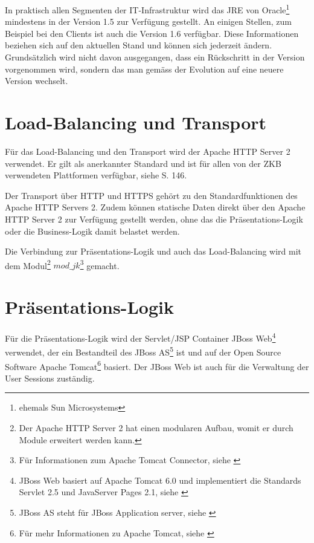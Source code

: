   In praktisch allen Segmenten der IT-Infrastruktur wird das \ac{JRE}
  von Oracle\footnote{ehemals Sun Microsystems} mindestens in der Version 1.5
  zur Verfügung gestellt. An einigen Stellen, zum Beispiel bei den Clients ist
  auch die Version 1.6 verfügbar. Diese Informationen beziehen sich auf den
  aktuellen Stand und können sich jederzeit ändern. Grundsätzlich wird nicht
  davon ausgegangen, dass ein Rückschritt in der Version vorgenommen wird,
  sondern das man gemäss der Evolution auf eine neuere Version wechselt.
  
  \section{Load-Balancing und Transport}
  
  Für das Load-Balancing und den Transport wird der Apache HTTP Server 2
  verwendet. Er gilt als anerkannter Standard und ist für allen von der \ac{ZKB}
  verwendeten Plattformen verfügbar, siehe \cite{ZkbHandbuchDerItArchitektur}
  S. 146.
  
  Der Transport über \ac{HTTP} und \ac{HTTPS} gehört zu den Standardfunktionen
  des Apache HTTP Servers 2. Zudem können statische Daten direkt über den
  Apache HTTP Server 2 zur Verfügung gestellt werden, ohne das die
  Präsentations-Logik oder die Business-Logik damit belastet werden.
  
  Die Verbindung zur Präsentations-Logik und auch das Load-Balancing wird mit
  dem Modul\footnote{Der Apache HTTP Server 2 hat einen modularen Aufbau, womit
  er durch Module erweitert werden kann.} \(mod\_jk\)\footnote{Für
  Informationen zum Apache Tomcat Connector, siehe \cite{ModJk}} gemacht.
  
  \section{Präsentations-Logik}
  
  Für die Präsentations-Logik wird der Servlet/JSP Container JBoss
  Web\footnote{JBoss Web basiert auf Apache Tomcat 6.0 und implementiert die
  Standards Servlet 2.5 und JavaServer Pages 2.1, siehe \cite{JBossWeb}}
  verwendet, der ein Bestandteil des JBoss AS\footnote{JBoss AS steht für JBoss
  Application server, siehe \cite{JBossAS}} ist und auf der Open Source Software
  Apache Tomcat\footnote{Für mehr Informationen zu Apache Tomcat, siehe
  \cite{ApacheTomcat}} basiert. Der JBoss Web ist auch für die Verwaltung der
  User Sessions zuständig.
  
